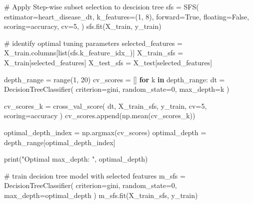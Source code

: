 \documentclass[
  11pt,
  letterpaper,
  DIV=11,
  numbers=noendperiod]{scrartcl}
\newenvironment{Shaded}{\begin{snugshade}}{\end{snugshade}}
\newcommand{\BuiltInTok}[1]{\textcolor[rgb]{0.00,0.23,0.31}{#1}}
\newcommand{\CommentTok}[1]{\textcolor[rgb]{0.37,0.37,0.37}{#1}}
\newcommand{\ControlFlowTok}[1]{\textcolor[rgb]{0.00,0.23,0.31}{\textbf{#1}}}
\newcommand{\DecValTok}[1]{\textcolor[rgb]{0.68,0.00,0.00}{#1}}
\newcommand{\KeywordTok}[1]{\textcolor[rgb]{0.00,0.23,0.31}{\textbf{#1}}}
\newcommand{\NormalTok}[1]{\textcolor[rgb]{0.00,0.23,0.31}{#1}}
\newcommand{\OperatorTok}[1]{\textcolor[rgb]{0.37,0.37,0.37}{#1}}
\newcommand{\StringTok}[1]{\textcolor[rgb]{0.13,0.47,0.30}{#1}}
\newcommand{\VariableTok}[1]{\textcolor[rgb]{0.07,0.07,0.07}{#1}}
\begin{document}
\begin{Shaded}
\begin{Highlighting}[]
\CommentTok{\# Apply Step{-}wise subset selection to descision tree}
\NormalTok{sfs }\OperatorTok{=}\NormalTok{ SFS(}
\NormalTok{    estimator}\OperatorTok{=}\NormalTok{heart\_disease\_dt,}
\NormalTok{    k\_features}\OperatorTok{=}\NormalTok{(}\DecValTok{1}\NormalTok{, }\DecValTok{8}\NormalTok{),}
\NormalTok{    forward}\OperatorTok{=}\VariableTok{True}\NormalTok{,}
\NormalTok{    floating}\OperatorTok{=}\VariableTok{False}\NormalTok{,}
\NormalTok{    scoring}\OperatorTok{=}\StringTok{\textquotesingle{}accuracy\textquotesingle{}}\NormalTok{,  }
\NormalTok{    cv}\OperatorTok{=}\DecValTok{5}\NormalTok{,}
\NormalTok{)}
\NormalTok{sfs.fit(X\_train, y\_train)}

\CommentTok{\# identify optimal tuning parameters}
\NormalTok{selected\_features }\OperatorTok{=}\NormalTok{ X\_train.columns[}\BuiltInTok{list}\NormalTok{(sfs.k\_feature\_idx\_)]}
\NormalTok{X\_train\_sfs }\OperatorTok{=}\NormalTok{ X\_train[selected\_features]}
\NormalTok{X\_test\_sfs }\OperatorTok{=}\NormalTok{ X\_test[selected\_features]}

\NormalTok{depth\_range }\OperatorTok{=} \BuiltInTok{range}\NormalTok{(}\DecValTok{1}\NormalTok{, }\DecValTok{20}\NormalTok{)}
\NormalTok{cv\_scores }\OperatorTok{=}\NormalTok{ []}
\ControlFlowTok{for}\NormalTok{ k }\KeywordTok{in}\NormalTok{ depth\_range:}
\NormalTok{    dt }\OperatorTok{=}\NormalTok{ DecisionTreeClassifier(}
\NormalTok{    criterion}\OperatorTok{=}\StringTok{\textquotesingle{}gini\textquotesingle{}}\NormalTok{, }
\NormalTok{    random\_state}\OperatorTok{=}\DecValTok{0}\NormalTok{,}
\NormalTok{    max\_depth}\OperatorTok{=}\NormalTok{k}
\NormalTok{    )}

\NormalTok{    cv\_scores\_k }\OperatorTok{=}\NormalTok{ cross\_val\_score(}
\NormalTok{        dt,}
\NormalTok{        X\_train\_sfs,}
\NormalTok{        y\_train,}
\NormalTok{        cv}\OperatorTok{=}\DecValTok{5}\NormalTok{,}
\NormalTok{        scoring}\OperatorTok{=}\StringTok{\textquotesingle{}accuracy\textquotesingle{}}
\NormalTok{    )}
\NormalTok{    cv\_scores.append(np.mean(cv\_scores\_k))}

\NormalTok{optimal\_depth\_index }\OperatorTok{=}\NormalTok{ np.argmax(cv\_scores)}
\NormalTok{optimal\_depth }\OperatorTok{=}\NormalTok{ depth\_range[optimal\_depth\_index]}

\BuiltInTok{print}\NormalTok{(}\StringTok{"Optimal max\_depth: "}\NormalTok{, optimal\_depth)}

\CommentTok{\# train decision tree model with selected features}
\NormalTok{m\_sfs }\OperatorTok{=}\NormalTok{ DecisionTreeClassifier(}
\NormalTok{    criterion}\OperatorTok{=}\StringTok{\textquotesingle{}gini\textquotesingle{}}\NormalTok{,}
\NormalTok{    random\_state}\OperatorTok{=}\DecValTok{0}\NormalTok{,}
\NormalTok{    max\_depth}\OperatorTok{=}\NormalTok{optimal\_depth}
\NormalTok{)}
\NormalTok{m\_sfs.fit(X\_train\_sfs, y\_train)}
\end{Highlighting}
\end{Shaded}
\end{document}
